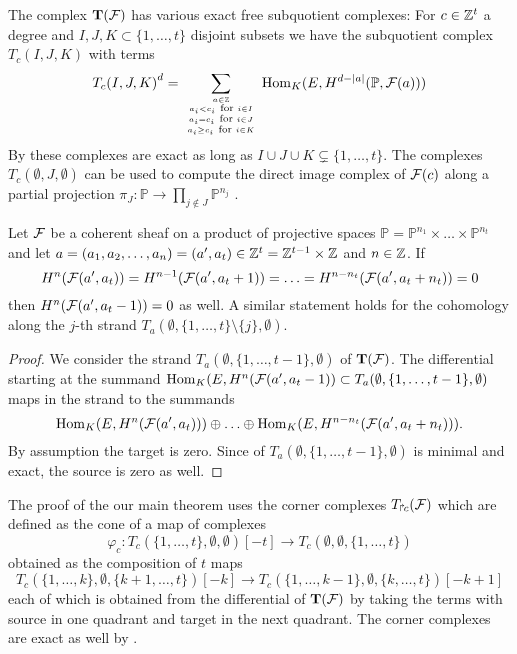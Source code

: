 \documentclass[twoside,12pt, leqno]{article}
\def\bT{{\bf T}}
\def\o{{\emptyset}}
\def\PP{{\mathbb P}}
\def\Tate#1#2#3#4{{T_#1(#2,#3,#4)}}
\begin{document}
The complex $\bT(\sF)$ has various exact free subquotient complexes: For $c\in {\mathbb Z}^t$ a degree and $I, J, K \subset \{1,\ldots, t \}$ disjoint subsets we have the subquotient complex $T_c(I,J,K)$ with terms
$$
\Tate c I J K ^d= \sum_{a \in \ZZ 
          \atop {a_i < c_i \hbox{ \scriptsize for } i \in I
         \atop {a_i  = c_i \hbox{ \scriptsize for } i \in J
         \atop a_i  \ge c_i \hbox{ \scriptsize for } i \in K}}} 
          \Hom_K(E,H^{d-|a|}(\PP,\sF(a)))
$$
By \cite[Theorem 3.3 and Corollary 3.5]{EES} these complexes are exact as long as $I \cup J \cup K \subsetneq \{1,\ldots,t \}$. 
The complexes $\Tate c \o J \o$ can be used to compute the direct image  complex of ${\mathcal F}(c)$ along a partial projection
$\pi_J \colon \PP \to \prod_{j \notin J } \PP^{n_j}$ \cite[Corollary 0.3 and Proposition 3.6]{EES}.

\begin{lemma}\label{on strands} Let ${\mathcal F}$ be a coherent sheaf on a product of projective spaces $\PP= \PP^{n_1} \times \ldots \times \PP^{n_t}$ and let
$a=(a_1,a_2,\ldots, a_n)=(a',a_t) \in {\mathbb Z}^t= {\mathbb Z}^{t-1} \times {\mathbb Z}^{}$ and $n\in {\mathbb Z}$.
If $$H^n({\mathcal F}(a',a_t))=H^{n-1}({\mathcal F}(a',a_t+1))=\ldots=H^{n-n_t}({\mathcal F}(a',a_t+n_t))=0$$   then
$H^n({\mathcal F}(a',a_t-1))=0$ as well. 
A similar statement holds for the cohomology along the $j$-th strand $T_a(\o,{\{1,\ldots,t\}\setminus \{j\}},\o)$.
\end{lemma}

\begin{proof} We consider the strand $T_a(\o,\{1,\ldots,t-1\},\o)$ of $\bT(\sF)$. The differential
starting at the summand $\Hom_K(E,H^n(\sF(a',a_t-1)) \subset T_a(\o,\{1,\ldots,t-1\},\o)$ maps in the strand  to the summands 
$$
\operatorname{Hom}_K(E, H^n({\mathcal F}(a',a_t)))\oplus  \ldots \oplus \operatorname{Hom}_K(E,H^{n-n_t}({\mathcal F}(a',a_t+n_t))).
$$ 
 By assumption the target is zero. Since of $T_a(\o,\{1,\ldots,t-1\},\o)$ is minimal and exact, the source
is zero as well. 
\end{proof}




The proof of the our main theorem uses the corner complexes $T_{\Rsh \kern -1pt c}({\mathcal F})$
which are defined as the cone of a map of complexes
$$
\varphi_{c}: T_c(\{1,\ldots,t\},\emptyset,\emptyset)[-t] \to T_c(\emptyset,\emptyset,\{1,\ldots,t\}) 
$$
obtained as the composition of $t$ maps
$$
T_c(\{1,\ldots,k\},\emptyset,\{k+1,\ldots,t\})[-k] \to  T_c(\{1,\ldots,k-1\},\emptyset,\{k,\ldots,t\})[-k+1] 
$$
each of which is obtained from the differential of $\bT(\sF)$ by taking the terms with source in one quadrant and target in the next quadrant. The corner complexes are exact as well by \cite[Theorem 4.3 and Corollary 4.5]{EES}. 
\end{document}
